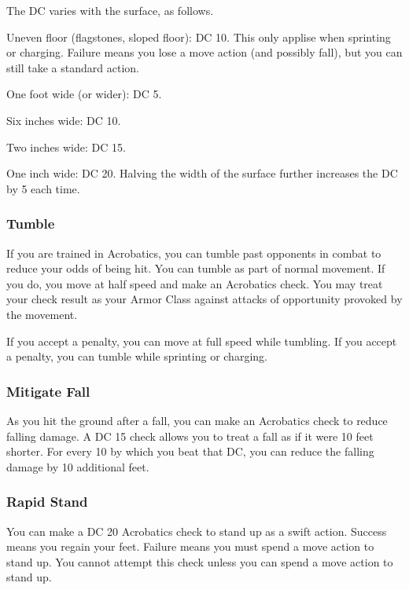 The DC varies with the surface, as follows.

\begin{itemize*}
  \item Uneven floor (flagstones, sloped floor): DC 10. This only applise when sprinting or charging. Failure means you lose a move action (and possibly fall), but you can still take a standard action.
  \item One foot wide (or wider): DC 5. 
  \item Six inches wide: DC 10.
  \item Two inches wide: DC 15.
  \item One inch wide: DC 20. Halving the width of the surface further increases the DC by 5 each time.
\end{itemize*}

\subsubsection{Tumble}
If you are trained in Acrobatics, you can tumble past opponents in combat to reduce your odds of being hit. You can tumble as part of normal movement. If you do, you move at half speed and make an Acrobatics check. You may treat your check result as your Armor Class against attacks of opportunity provoked by the movement.

If you accept a  penalty, you can move at full speed while tumbling. If you accept a  penalty, you can tumble while sprinting or charging.

\subsubsection{Mitigate Fall}
As you hit the ground after a fall, you can make an Acrobatics check to reduce falling damage. A DC 15 check allows you to treat a fall as if it were 10 feet shorter. For every 10 by which you beat that DC, you can reduce the falling damage by 10 additional feet.

\subsubsection{Rapid Stand}
You can make a DC 20 Acrobatics check to stand up as a swift action. Success means you regain your feet. Failure means you must spend a move action to stand up. You cannot attempt this check unless you can spend a move action to stand up. 

